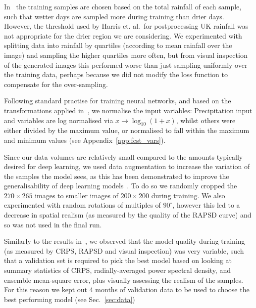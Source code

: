 \documentclass[../main.tex]{subfiles}
\begin{document}

In~\cite{harris_generative_2022} the training samples are chosen based on the total rainfall of each sample, such that wetter days are sampled more during training than drier days. However, the threshold used by Harris et. al.~for postprocessing UK rainfall was not appropriate for the drier region we are considering. We experimented with splitting data into rainfall by quartiles (according to mean rainfall over the image) and sampling the higher quartiles more often, but from visual inspection of the generated images this performed worse than just sampling uniformly over the training data, perhaps because we did not modify the loss function to compensate for the over-sampling.

Following standard practise for training neural networks, and based on the transformations applied in~\cite{harris_generative_2022}, we normalise the input variables: Precipitation input and variables are log normalised via $x \to \log_{10}(1 + x)$, whilst others were either divided by the maximum value, or normalised to fall within the maximum and minimum values (see Appendix~\ref{app:fcst_vars}).


Since our data volumes are relatively small compared to the amounts typically desired for deep learning, we used data augmentation to increase the variation of the samples the model sees, as this has been demonstrated to improve the generalisability of deep learning models~\citep{goodfellow_deep_2016}. To do so we randomly cropped the $270 \times 265$ images to smaller images of $200 \times 200$ during training. We also experimented with random rotations of multiples of $90^{\circ}$, however this led to a decrease in spatial realism (as measured by the quality of the RAPSD curve) and so was not used in the final run.



Similarly to the results in~\cite{harris_generative_2022}, we observed that the model quality during training (as measured by CRPS, RAPSD and visual inspection) was very variable, such that a validation set is required to pick the best model based on looking at summary statistics of CRPS, radially-averaged power spectral density, and ensemble mean-square error, plus visually assessing the realism of the samples. For this reason we kept out 4 months of validation data to be used to choose the best performing model (see Sec.~\ref{sec:data})
\end{document}
